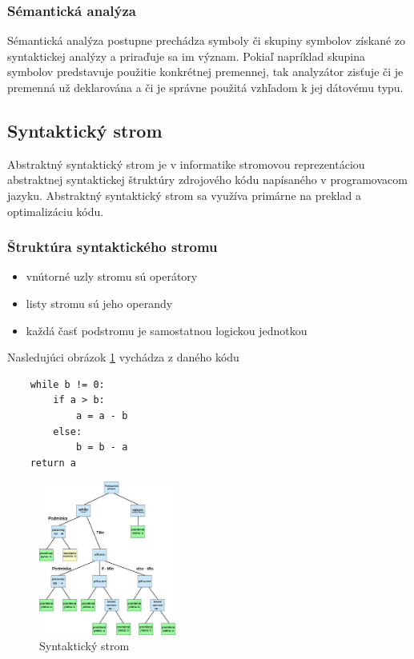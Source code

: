 \subsubsection{Sémantická analýza}
Sémantická analýza postupne prechádza symboly či skupiny symbolov získané 
zo syntaktickej analýzy a priraďuje sa im význam. Pokiaľ napríklad skupina symbolov
predstavuje použitie konkrétnej premennej, tak analyzátor zisťuje či je premenná už 
deklarována a či je správne použitá  vzhľadom k jej dátovému typu.

\subsection{Syntaktický strom}
Abstraktný syntaktický strom je v informatike stromovou reprezentáciou 
abstraktnej syntaktickej štruktúry zdrojového kódu 
napísaného v programovacom jazyku. 
Abstraktný syntaktický strom sa využíva primárne na preklad a optimalizáciu kódu.

\subsubsection{Štruktúra syntaktického stromu}

\begin{itemize}
	\item vnútorné uzly stromu sú operátory

	\item listy stromu sú jeho operandy

	\item každá časť podstromu je samostatnou logickou jednotkou
\end{itemize}

Nasledujúci obrázok \ref{obr:tree} vychádza z daného kódu
\begin{lstlisting}
	while b != 0:
		if a > b:
			a = a - b
		else:
			b = b - a
	return a
\end{lstlisting}


\begin{figure}[H]
    \centering
    \includegraphics[width=0.4\textwidth]{images/syntakticky_strom}
    \caption[Syntaktický strom]{Syntaktický strom}
    \label{obr:tree}
\end{figure}



